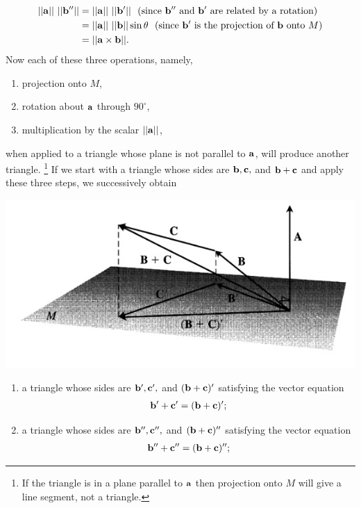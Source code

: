 \documentclass[12pt,letterpaper,reqno]{article}
\numberwithin{equation}{section}
\begin{document}
\begin{pf}
\begin{enumerate}[(1)]
\begin{align*}
	||{\bf a}|| \ ||{\bf b}''||&=||{\bf a}|| \ ||{\bf b}'|| \ \text{ (since ${\bf b}''$ and ${\bf b}'$ are related by a rotation)} \\
	&=||{\bf a}|| \ ||{\bf b}||\sin\theta \ \text{ (since ${\bf b}'$ is the projection of ${\bf b}$ onto $M$)} \\
	&=||{\bf a} \times {\bf b}||. 
\end{align*}
Now each of these three operations, namely,
\begin{enumerate}
\item projection onto $M$,
\item rotation about ${\bf a}$ through $90^\circ$, 
\item multiplication by the scalar $||{\bf a}||$,
\end{enumerate}
when applied to a triangle whose plane is not parallel to ${\bf a}$, will produce another triangle. \footnote{If the triangle is in a plane parallel to ${\bf a}$ then projection onto $M$ will give a line segment, not a triangle.} If we start with a triangle whose sides are ${\bf b}, {\bf c},$ and ${\bf b}+{\bf c}$ and apply these three steps, we successively obtain
\begin{center}
	\includegraphics[scale=0.5]{figures_mvc/distributivity_of_the_cross_product_2}
\end{center}
\begin{enumerate}
\item a triangle whose sides are ${\bf b}', {\bf c}',$ and $({\bf b}+{\bf c})'$ satisfying the vector equation
	\begin{align*}
		{\bf b}'+{\bf c}'=({\bf b}+{\bf c})';
	\end{align*}
\item a triangle whose sides are ${\bf b}'', {\bf c}'',$ and $({\bf b}+{\bf c})''$ satisfying the vector equation
	\begin{align*}
		{\bf b}''+{\bf c}''=({\bf b}+{\bf c})'';

\end{align*}
\end{enumerate}
\end{enumerate}
\end{pf}
\end{document}
